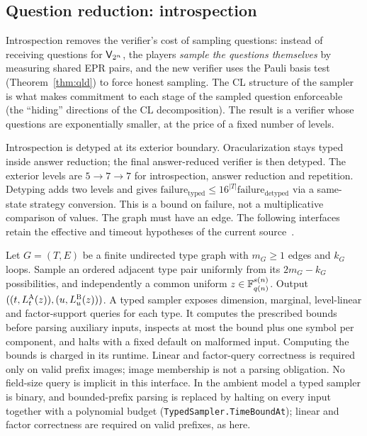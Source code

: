 \subsection{Question reduction: introspection}
\label{sec:ps-introspection}

Introspection removes the verifier's cost of sampling questions: instead of receiving
questions for $\mathsf{V}_{2^n}$, the players \emph{sample the questions themselves} by
measuring shared EPR pairs, and the new verifier uses the Pauli basis test
(Theorem~\ref{thm:qld}) to force honest sampling. The CL structure of the sampler is
what makes commitment to each stage of the sampled question enforceable (the ``hiding''
directions of the CL decomposition). The result is a verifier whose questions are
exponentially smaller, at the price of a fixed number of levels.

\begin{remark}
\label{rem:typed-detyping}
Introspection is detyped at its exterior boundary. Oracularization stays typed
inside answer reduction; the final answer-reduced verifier is then detyped.
The exterior levels are $5\to7\to7$ for introspection, answer reduction and
repetition. Detyping adds two levels and gives
$\mathrm{failure}_{\mathrm{typed}}\leq16^{|T|}
\mathrm{failure}_{\mathrm{detyped}}$ via a same-state strategy conversion.
This is a bound on failure, not a multiplicative comparison of values.
The graph must have an edge. The following interfaces retain the effective
and timeout hypotheses of the current source~\cite{AuditSync26}.
\end{remark}

\begin{definition}
\label{def:typed-sampler-interface}
\leanok
Let $G=(T,E)$ be a finite undirected type graph with $m_G\geq1$ edges and
$k_G$ loops. Sample an ordered adjacent type pair uniformly from its
$2m_G-k_G$ possibilities, and independently a common uniform
$z\in\mathbb{F}_{q(n)}^{s(n)}$. Output
$((t,L_t^{\textsc{A}}(z)),(u,L_u^{\textsc{B}}(z)))$.
A typed sampler exposes dimension, marginal, level-linear and factor-support
queries for each type. It computes the prescribed bounds before parsing
auxiliary inputs, inspects at most the bound plus one symbol per component,
and halts with a fixed default on malformed input. Computing the bounds is
charged in its runtime. Linear and factor-query correctness is required only
on valid prefix images; image membership is not a parsing obligation.
No field-size query is implicit in this interface.
In the ambient model a typed sampler is binary, and bounded-prefix parsing is replaced by
halting on every input together with a polynomial budget
(\texttt{TypedSampler.TimeBoundAt}); linear and factor correctness are required on valid
prefixes, as here.
\end{definition}

